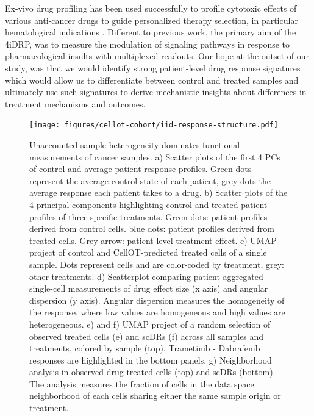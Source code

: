 
Ex-vivo drug profiling has been used successfully to profile cytotoxic effects of various anti-cancer drugs to guide personalized therapy selection, in particular hematological indications \cite{need,need}.
Different to previous work, the primary aim of the 4iDRP, was to measure the modulation of signaling pathways in response to pharmacological insults with multiplexed readouts.
Our hope at the outset of our study, was that we would identify strong patient-level drug response signatures which would allow us to differentiate between control and treated samples and ultimately use such signatures to derive mechanistic insights about differences in treatment mechanisms and outcomes.  

\begin{figure}[htp!]
  \begin{center}
    \texttt{[image: figures/cellot-cohort/iid-response-structure.pdf]}
  \end{center}
  \caption{Unaccounted sample heterogeneity dominates functional measurements of cancer samples. a) Scatter plots of the first 4 PCs of control and average patient response profiles. Green dots represent the average control state of each patient, grey dots the average response each patient takes to a drug.
  b) Scatter plots of the 4 principal components highlighting control and treated patient profiles of three specific treatments. Green dots: patient profiles derived from control cells. blue dots: patient profiles derived from treated cells. Grey arrow: patient-level treatment effect.
  c) UMAP project of control and CellOT-predicted treated cells of a single sample. Dots represent cells and are color-coded by treatment, grey: other treatments.
  d) Scatterplot comparing patient-aggregated single-cell measurements of drug effect size (x axis) and angular dispersion (y axis). Angular dispersion measures the homogeneity of the response, where low values are homogeneous and high values are heterogeneous.
  e) and f) UMAP project of a random selection of observed treated cells (e) and scDRs (f) across all samples and treatments, colored by sample (top). Trametinib - Dabrafenib responses are highlighted in the bottom panels.
  g) Neighborhood analysis in observed drug treated cells (top) and scDRs (bottom). The analysis measures the fraction of cells in the data space neighborhood of each cells sharing either the same sample origin or treatment.
 }
  \label{fig:iid-structure}
\end{figure}

